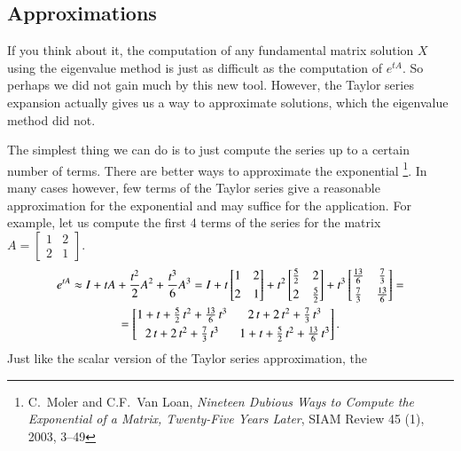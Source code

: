 \documentclass[12pt]{book}
\begin{document}
\subsection{Approximations}

If you think about it, the computation of any fundamental matrix solution
$X$ using the eigenvalue method is
just as difficult as the computation of $e^{tA}$.
So perhaps we did not gain
much by this new tool.  However, the Taylor series expansion actually gives
us a way to approximate solutions, which the eigenvalue method did
not.

The simplest thing we can do
is to just compute the series up to a certain number of terms.  There
are better ways to approximate the exponential%
\footnote{C.\ Moler and C.F.\ Van Loan, \emph{Nineteen Dubious Ways
to Compute the Exponential of a Matrix, Twenty-Five Years Later}, SIAM Review
45 (1), 2003, 3--49}.  In many cases however,
few terms of the Taylor series give
a reasonable approximation for the exponential and may suffice for
the application.  For example, let us compute the first 4 terms of the
series for the matrix $A = 
\left[ \begin{smallmatrix}
1 & 2 \\
2 & 1
\end{smallmatrix} \right]$.
\begin{multline*}
e^{tA}
\approx
I + tA + \frac{t^2}{2}A^2 + \frac{t^3}{6}A^3
=
I + t
\begin{bmatrix}
1 & 2 \\
\noalign{\smallskip}
2 & 1
\end{bmatrix}
+ t^2
\begin{bmatrix}
\frac{5}{2} & 2 \\
\noalign{\smallskip}
2 & \frac{5}{2}
\end{bmatrix}
+ t^3
\begin{bmatrix}
\frac{13}{6} & \frac{7}{3} \\
\noalign{\smallskip}
\frac{7}{3} & \frac{13}{6}
\end{bmatrix}
=
\\
=
\begin{bmatrix}
1 + t + \frac{5}{2}\, t^2 + \frac{13}{6}\, t^3 &
   2\,t + 2\, t^2   + \frac{7}{3}\, t^3 \\
\noalign{\smallskip}
   2\,t + 2\, t^2   + \frac{7}{3}\, t^3 &
1 + t + \frac{5}{2}\, t^2 + \frac{13}{6}\, t^3
\end{bmatrix} .
\end{multline*}
Just like the scalar version of the Taylor series approximation, the
\end{document}
